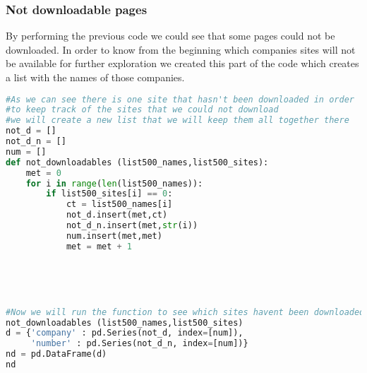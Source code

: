 \documentclass{article}
\begin{document}
\subsubsection{Not downloadable pages}
By performing the previous code we could see that some pages could not be downloaded. In order to know from the beginning which companies sites will not be available for further exploration we created this part of the code which creates a list with the names of those companies.
\begin{lstlisting}[language=Python]
#As we can see there is one site that hasn't been downloaded in order
#to keep track of the sites that we could not download
#we will create a new list that we will keep them all together there
not_d = []
not_d_n = []
num = []
def not_downloadables (list500_names,list500_sites):
    met = 0       
    for i in range(len(list500_names)):       
        if list500_sites[i] == 0:
            ct = list500_names[i]
            not_d.insert(met,ct)
            not_d_n.insert(met,str(i))
            num.insert(met,met)
            met = met + 1
   
 


 
#Now we will run the function to see which sites havent been downloaded
not_downloadables (list500_names,list500_sites)
d = {'company' : pd.Series(not_d, index=[num]),
     'number' : pd.Series(not_d_n, index=[num])}
nd = pd.DataFrame(d)    
nd
\end{lstlisting}
\end{document}
